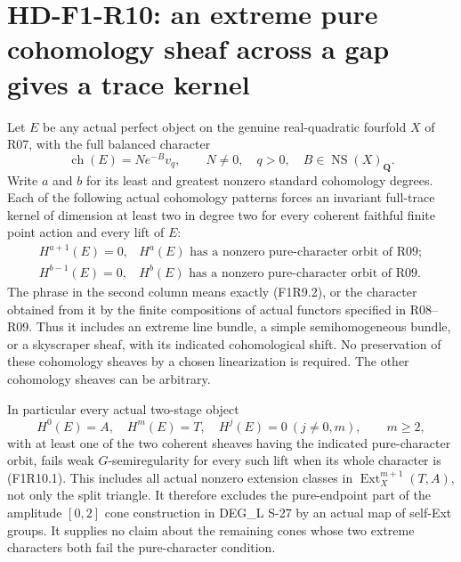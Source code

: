 \section{HD-F1-R10: an extreme pure cohomology sheaf across a gap gives a trace kernel}
\label{sec:followup-rm-gap-obstruction}

Let $E$ be any actual perfect object on the genuine real-quadratic
fourfold $X$ of R07, with the full balanced character
\[
 \operatorname{ch}(E)=N e^{-B}v_q,\qquad
 N\ne0,\quad q>0,\quad B\in\operatorname{NS}(X)_{\mathbf Q}.
 \tag{F1R10.1}
\]
Write $a$ and $b$ for its least and greatest nonzero standard
cohomology degrees. Each of the following actual cohomology
patterns forces an invariant full-trace kernel of dimension at least
two in degree two for every coherent faithful finite point action and every
lift of $E$:
\[
 \begin{array}{ll}
 H^{a+1}(E)=0,&
 H^a(E)\text{ has a nonzero pure-character orbit of R09};\\[2pt]
 H^{b-1}(E)=0,&
 H^b(E)\text{ has a nonzero pure-character orbit of R09}.
 \end{array}
 \tag{F1R10.2}
\]
The phrase in the second column means exactly (F1R9.2), or the
character obtained from it by the finite compositions of actual
functors specified in R08--R09. Thus it includes an extreme line
bundle, a simple semihomogeneous bundle, or a skyscraper sheaf,
with its indicated cohomological shift. No preservation of these
cohomology sheaves by a chosen linearization is required.
The other cohomology sheaves can be arbitrary.

In particular every actual two-stage object
\[
 H^0(E)=A,\quad H^m(E)=T,\quad
 H^j(E)=0\ (j\ne0,m),\qquad m\ge2,
 \tag{F1R10.3}
\]
with at least one of the two coherent sheaves having the indicated
pure-character orbit, fails weak $G$-semiregularity for every
such lift when its whole character is (F1R10.1). This includes
all actual nonzero extension classes in
$\operatorname{Ext}^{m+1}_X(T,A)$, not only the split triangle.
It therefore excludes the pure-endpoint part of the
amplitude $[0,2]$ cone construction in DEG\_L S-27 by an actual
map of self-Ext groups. It supplies no claim about the
remaining cones whose two extreme characters both fail the
pure-character condition.


